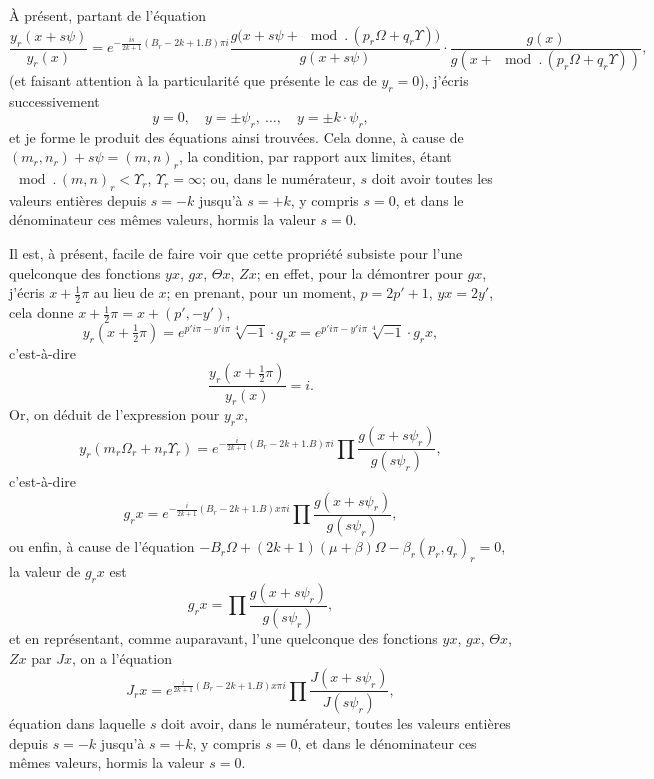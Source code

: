 \documentclass[11pt,a4paper]{article}
\theoremstyle{definition}
\begin{document}
\medskip

\`A pr\'esent, partant de l'\'equation
\[
\frac{y_r(x+s\psi)}{y_r(x)}
= e^{-\frac{is}{2k+1}(B_r-2k+1.B)\pi i}
\frac{g\bigl(x + s\psi + \mod.\,(p_r\Omega+q_r\Upsilon)\bigr)}{g(x+s\psi)}
\cdot
\frac{g(x)}{g(x+\mod.\,(p_r\Omega+q_r\Upsilon))},
\]
(et faisant attention \`a la particularit\'e que pr\'esente le cas de
$y_r = 0$), j'\'ecris successivement
\[
y = 0,\quad y = \pm\psi_r,\ \ldots,\quad y = \pm k\cdot\psi_r,
\]
et je forme le produit des \'equations ainsi trouv\'ees. Cela donne, \`a cause de
$(m_r, n_r) + s\psi = (m,n)_r$, la condition, par rapport aux limites,
\'etant $\mod.\,(m,n)_r < \Upsilon_r$, $\Upsilon_r = \infty$; ou, dans le
num\'erateur, $s$ doit avoir toutes les valeurs enti\`eres depuis $s=-k$
jusqu'\`a $s=+k$, y compris $s=0$, et dans le d\'enominateur ces m\^emes
valeurs, hormis la valeur $s=0$.

Il est, \`a pr\'esent, facile de faire voir que cette propri\'et\'e subsiste
pour l'une quelconque des fonctions $yx$, $gx$, $\Theta x$, $Zx$; en effet,
pour la d\'emontrer pour $gx$, j'\'ecris $x+\tfrac{1}{2}\pi$ au lieu de $x$;
en prenant, pour un moment, $p = 2p'+1$, $yx = 2y'$, cela donne
$x+\tfrac{1}{2}\pi = x+(p', -y')$,
\[
y_r(x+\tfrac{1}{2}\pi) = e^{p'i\pi - y'i\pi}\sqrt[4]{-1}\cdot g_r x
= e^{p'i\pi - y'i\pi} \sqrt[4]{-1} \cdot g_r x,
\]
c'est-\`a-dire
\[
\frac{y_r(x+\tfrac{1}{2}\pi)}{y_r(x)} = i.
\]
Or, on d\'eduit de l'expression pour $y_r x$,
\[
y_r(m_r\Omega_r + n_r\Upsilon_r) =
e^{-\frac{i}{2k+1}(B_r-2k+1.B)\pi i}
\prod \frac{g(x+s\psi_r)}{g(s\psi_r)},
\]
c'est-\`a-dire
\[
g_r x = e^{-\frac{i}{2k+1}(B_r-2k+1.B)x\pi i}
\prod \frac{g(x+s\psi_r)}{g(s\psi_r)},
\]
ou enfin, \`a cause de l'\'equation
$-B_r\Omega + (2k+1)(\mu+\beta)\Omega - \beta_r(p_r, q_r)_r = 0$,
la valeur de $g_r x$ est
\[
g_r x = \prod \frac{g(x+s\psi_r)}{g(s\psi_r)},
\]
et en repr\'esentant, comme auparavant, l'une quelconque des fonctions
$yx$, $gx$, $\Theta x$, $Zx$ par $Jx$, on a l'\'equation
\[
J_r x = e^{\frac{i}{2k+1}(B_r-2k+1.B)x\pi i}
\prod \frac{J(x+s\psi_r)}{J(s\psi_r)},
\]
\'equation dans laquelle $s$ doit avoir, dans le num\'erateur, toutes les
valeurs enti\`eres depuis $s=-k$ jusqu'\`a $s=+k$, y compris $s=0$, et dans
le d\'enominateur ces m\^emes valeurs, hormis la valeur $s=0$.
\end{document}
